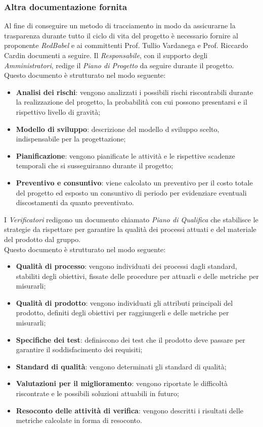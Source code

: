\subsubsection{Altra documentazione fornita}
Al fine di conseguire un metodo di tracciamento in modo da assicurarne la trasparenza durante tutto il ciclo di vita del progetto è necessario fornire al proponente \textit{RedBabel} e ai committenti Prof. Tullio Vardanega e Prof. Riccardo Cardin documenti a seguire.
Il \textit{Responsabile}, con il supporto degli \textit{Amministratori}, redige il \textit{Piano di Progetto} da seguire durante il progetto.
\\Questo documento è strutturato nel modo seguente:
\begin{itemize}
    \item \textbf{Analisi dei rischi}: vengono analizzati i possibili rischi riscontrabili durante la realizzazione del progetto, la probabilità con cui possono presentarsi e il rispettivo livello di gravità;
    \item \textbf{Modello di sviluppo}: descrizione del modello d sviluppo scelto, indispensabile per la progettazione;
    \item \textbf{Pianificazione}: vengono pianificate le attività e le rispettive scadenze temporali che si susseguiranno durante il progetto;
    \item \textbf{Preventivo e consuntivo}: viene calcolato un preventivo per il costo totale del progetto ed esposto un consuntivo di periodo per evidenziare eventuali discostamenti da quanto preventivato.
\end{itemize}
I \textit{Verificatori} redigono un documento chiamato \textit{Piano di Qualifica} che stabilisce le strategie da rispettare per garantire la qualità dei processi attuati e del materiale del prodotto dal gruppo.
\\Questo documento è strutturato nel modo seguente:
\begin{itemize}
    \item \textbf{Qualità di processo}: vengono individuati dei processi dagli standard, stabiliti degli obiettivi, fissate delle procedure per attuarli e delle metriche per misurarli;
    \item \textbf{Qualità di prodotto}: vengono individuati gli attributi principali del prodotto, definiti degli obiettivi per raggiungerli e delle metriche per misurarli;
    \item \textbf{Specifiche dei test}: definiscono dei test che il prodotto deve passare per garantire il soddisfacimento dei requisiti;
    \item \textbf{Standard di qualità}: vengono determinati gli standard di qualità;
    \item \textbf{Valutazioni per il miglioramento}: vengono riportate le difficoltà riscontrate e le possibili soluzioni attuabili in futuro;
    \item \textbf{Resoconto delle attività di verifica}: vengono descritti i risultati delle metriche calcolate in forma di resoconto.
\end{itemize}
